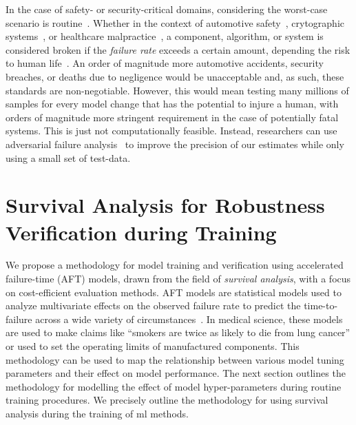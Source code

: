 \documentclass[sn-mathphys-num]{sn-jnl}%
\begin{document}
In the case of safety- or security-critical domains, considering the worst-case scenario is routine~\cite{sajid2013cloud}. Whether in the context of automotive safety~\cite{ai_automotive}, crytographic systems~\cite{leurent2020sha,kamal2017study}, or healthcare malpractice~\cite{ai_medical_imaging}, a component, algorithm, or system is considered broken if the \textit{failure rate} exceeds a certain amount, depending the risk to human life~\cite{IEC61508}. An order of magnitude more automotive accidents, security breaches, or deaths due to negligence would be unacceptable and, as such, these standards are non-negotiable. However, this would mean testing many millions of samples for every model change that has the potential to injure a human, with orders of magnitude more stringent requirement in the case of potentially fatal systems. This is just not computationally feasible. Instead, researchers can use adversarial failure analysis~\cite{carlini_towards_2017,biggio_evasion_2013,meyers} to improve the precision of our estimates while only using a small set of test-data.





\section{Survival Analysis for Robustness Verification during Training}
\label{aft}

We propose a methodology for model training and verification using accelerated failure-time (AFT) models, drawn from the field of \textit{survival analysis}, with a focus on cost-efficient evaluation methods.
AFT models are statistical models used to analyze multivariate effects on the observed failure rate to predict the time-to-failure across a wide variety of circumstances~\cite{aft_models,kleinbaum1996survival}. In medical science, these models are used to make claims like ``smokers are twice as likely to die from lung cancer'' or used to set the operating limits of manufactured components. This methodology can be used to map the relationship between various model tuning parameters and their effect on model performance.
The next section outlines the methodology for modelling the effect of model hyper-parameters during routine training procedures. We precisely outline the methodology for using survival analysis during the training of \acrshort{ml} methods.
\end{document}
